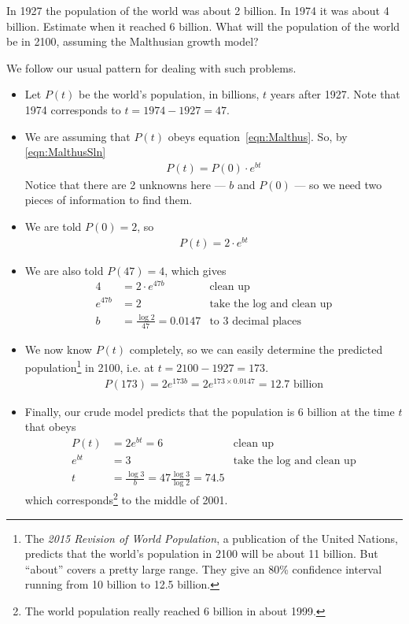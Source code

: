 \begin{eg}\label{eg:SDEpopgthA}
In 1927 the population of the world was about 2 billion.
In 1974 it was about 4 billion. Estimate when it reached
6 billion. What will the population of the world be in 2100,
assuming the Malthusian growth model?

 \soln We follow our usual pattern for dealing with such problems.
 \begin{itemize}
 \item Let $P(t)$ be the world's population, in billions,
$t$ years after 1927.
Note that 1974 corresponds to $t=1974-1927 = 47$.

 \item We are assuming that $P(t)$ obeys equation~\eqref{eqn:Malthus}.
So, by \eqref{eqn:MalthusSln}
 \begin{align*}
           P(t)=P(0)\cdot e^{bt}
 \end{align*}
 Notice that there are 2 unknowns here --- $b$ and $P(0)$
  --- so we need two pieces of information to find them.

 \item We are told $P(0)=2$, so
 \begin{align*}
   P(t)=2\cdot e^{bt}
 \end{align*}
 \item We are also told $P(47)=4$, which gives
 \begin{align*}
   4 &=2\cdot e^{47b} & \text{clean up}\\
   e^{47b}&=2 & \text{take the log and clean up}\\
   b&=\frac{\log 2}{47} = 0.0147 & \text{to 3 decimal places}
 \end{align*}
 \item We now know $P(t)$ completely, so we can easily determine
the predicted population\footnote{The \emph{2015 Revision of
World Population}, a publication of the United Nations, predicts
that the world's population in 2100 will be about 11 billion.
But ``about'' covers a pretty large range. They give an 80\% confidence
interval running from 10 billion to 12.5 billion.} in 2100,
i.e. at $t=2100-1927 = 173$.
 \begin{align*}
   P(173) = 2 e^{173 b} = 2 e^{173\times 0.0147} = 12.7\text{ billion}
 \end{align*}

\item Finally, our crude model predicts that the population is
6 billion at the time $t$ that obeys
 \begin{align*}
   P(t) &= 2 e^{b t} = 6 & \text{clean up}\\
   e^{b t}&=3 & \text{take the log and clean up}\\
   t&=\frac{\log 3}{b} = 47\frac{\log 3}{\log 2}
                       = 74.5
 \end{align*}
which corresponds\footnote{The world population really reached
6 billion in about 1999.}  to the middle of 2001.
\end{itemize}
\end{eg}


